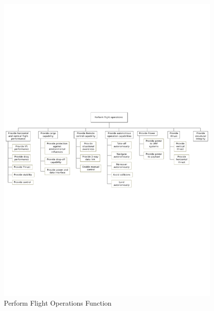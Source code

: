 \begin{figure}[htb]
\centering
\includegraphics[width=\textwidth]{./ProjectDescription/Figures/FBS-FlightOps}
\caption{Perform Flight Operations Function}
\label{fig:FBS-FlightOps}
\end{figure}


